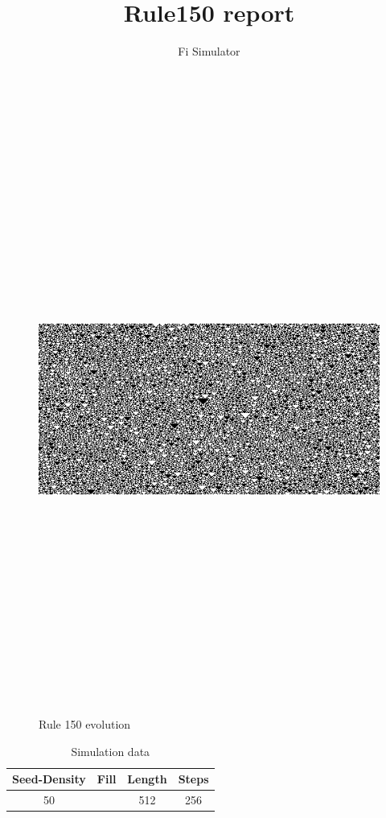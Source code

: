 \documentclass[12pt, letterpaper]{article}
\title{Rule150 report}
\author{Fi Simulator}
\begin{document}
 
\begin{titlepage} 
\maketitle 
\tableofcontents 
\end{titlepage} 
\clearpage 
\begin{figure}[H]
	\centering
	\includegraphics[height=200mm, width=200mm, keepaspectratio]{simAnalysis.png} 
	\caption{Rule 150 evolution} 
\end{figure}
\begin{table}[H]
	\centering
	\begin{tabular}{|c|c|c|c| }
		\hline Seed-Density & Fill & Length & Steps \\ 
			\hline 50 &  & 512 & 256 \\ 
			\hline 
	\end{tabular} 
	\caption{Simulation data} 
\end{table} 
\end{document}
